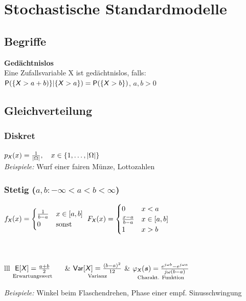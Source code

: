 \documentclass[german,color,6pt]{latex4ei/latex4ei_sheet}
\begin{document}
\section{Stochastische Standardmodelle}
\begin{sectionbox}
	\subsection{Begriffe}
	\textbf{Gedächtnislos}\\ 
	Eine Zufallsvariable X ist gedächtnislos, falls: \\
	$\operatorname{\textsf{P}}(\{\operatorname{\textsf{\textit{X}}} > a + b)\} | \{\operatorname{\textsf{\textit{X}}} > a\}) = \operatorname{\textsf{P}}(\{\operatorname{\textsf{\textit{X}}} > b\})$, \qquad $a,b > 0$	
	
\end{sectionbox}
\begin{sectionbox}
	\subsection{Gleichverteilung}
	\subsubsection{Diskret}
	$p_{\operatorname{\textsf{\textit{X}}}}(x) = \frac{1}{|\Omega|}, \quad x \in \left\{1,\dots,\left\vert\Omega\right\vert\right\}$\\
	\emph{Beispiele:} Wurf einer fairen Münze, Lottozahlen			
	
	\subsubsection{Stetig ($a,b: -\infty < a < b < \infty$)}
	$f_{\operatorname{\textsf{\textit{X}}}}(x) = \begin{cases}
	\frac{1}{b - a} & x \in [a,b] \\
	0 & \text{sonst} \\
	\end{cases}$
	\qquad
	$F_{\operatorname{\textsf{\textit{X}}}}(x) = \begin{cases}
	0 & x < a \\
	\frac{x-a}{b - a} & x \in [a,b] \\
	1 & x > b \\
	\end{cases}$					
	\\ \\  \\ 
	\everymath{\displaystyle}
	\begin{tablebox}{lll}
		$\underset{\text{Erwartungswert}}{\operatorname{\textsf{E}}[\operatorname{\textsf{\textit{X}}}] =\frac{a+b}{2}}\quad\ $ & $\underset{\text{Varianz}}{\operatorname{\textsf{Var}}[\operatorname{\textsf{\textit{X}}}] =\frac{(b-a)^2}{12}}$ & $\underset{\text{Charakt. Funktion}}{\varphi_{\operatorname{\textsf{\textit{X}}}}(\boldsymbol{s}) = \frac{e^{j \omega b}-e^{j \omega a}}{j \omega (b-a)}}$\\
	\end{tablebox}
	\emph{Beispiele:} Winkel beim Flaschendrehen, Phase einer empf. Sinusschwingung
	
\end{sectionbox}
\end{document}
